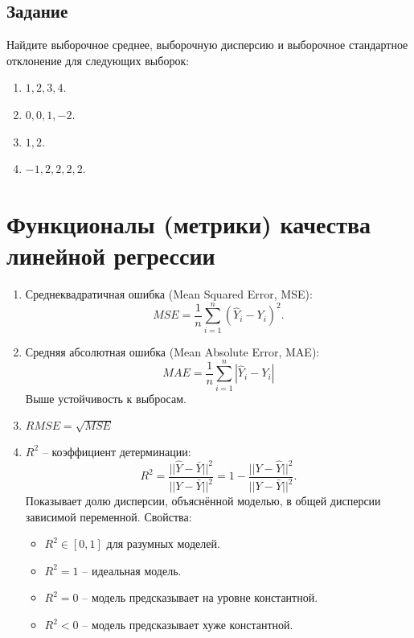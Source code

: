 \documentclass[11pt, a4paper]{extarticle}
\begin{document}
\subsection{Задание}
Найдите выборочное среднее, выборочную дисперсию и выборочное стандартное отклонение для следующих выборок:
\begin{multicols}{2}
\begin{enumerate}[label=\alph*)]
	\item $1, 2, 3, 4$.
	\item $0, 0, 1, -2$.
	\item $1, 2$.
	\item $-1, 2, 2, 2, 2$.
\end{enumerate}
\end{multicols}


\section{Функционалы (метрики) качества линейной регрессии}

\begin{enumerate}
	\item Среднеквадратичная ошибка (Mean Squared Error, MSE):
	\[
	MSE = \dfrac{1}{n}\sum_{i=1}^{n}(\hat{Y}_i - Y_i)^2.
	\]
	\item Средняя абсолютная ошибка (Mean Absolute Error, MAE):
	\[
	MAE = \dfrac{1}{n}\sum_{i = 1}^{n}|\hat{Y}_i - Y_i|
	\]
	Выше устойчивость к выбросам.
	\item $RMSE = \sqrt{MSE}$
	\item $R^2$ – коэффициент детерминации:
	\[
	R^2 = \dfrac{||\hat{Y} - \bar{Y}||^2}{||Y - \bar{Y}||^2} = 1 - \dfrac{||Y - \hat{Y}||^2}{||Y - \bar{Y}||^2}.
	\]
	Показывает долю дисперсии, объяснённой моделью, в общей дисперсии зависимой переменной. 
	Свойства:
	\begin{itemize}
		\item $R^2 \in [0, 1]$ для разумных моделей.
		\item $R^2 = 1$ – идеальная модель.
		\item $R^2 = 0$ – модель предсказывает на уровне константной.
		\item $R^2 < 0$ – модель предсказывает хуже константной. 
	\end{itemize}
\end{enumerate}
\end{document}
